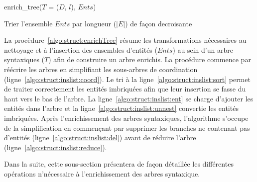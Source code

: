 \begin{procedure}[htb]
    \caption{enrich\_tree($T$ = ($D$, $l$), $Ents$)}
    \label{algo:struct:enrichTree}



    Trier l'ensemble $Ents$ par longueur ($|E|$) de façon decroisante\label{algo:struct:inslist:sort}\;

\end{procedure}

La procèdure~\ref{algo:struct:enrichTree} résume les transformations nécessaires au nettoyage et à l'insertion des ensembles d'entités ($Ents$) au sein d'un arbre syntaxiques ($T$) afin de construire un arbre enrichis.
La procédure commence par réécrire les arbres en simplifiant les sous-arbres de coordination (ligne~\ref{algo:struct:inslist:coord}).
Le tri à la ligne~\ref{algo:struct:inslist:sort} permet de traiter correctement les entités imbriquées afin que leur insertion se fasse du haut vers le bas de l'arbre.
La ligne~\ref{algo:struct:inslist:ent} se charge d'ajouter les entités dans l'arbre et la ligne~\ref{algo:struct:inslist:unnest} convertie les entités imbriquées.
Après l'enrichissement des arbres syntaxiques, l'algorithme s'occupe de la simplification en commençant par supprimer les branches ne contenant pas d'entités (ligne~\ref{algo:struct:inslist:del}) avant de réduire l'arbre (ligne~\ref{algo:struct:inslist:reduce}).

Dans la suite, cette sous-section présentera de façon détaillée les différentes opérations n'nécessaire à l'enrichissement des arbres syntaxique.

